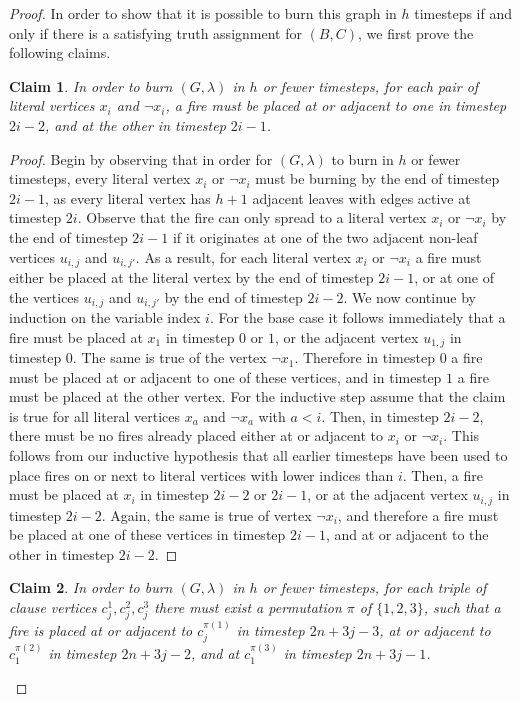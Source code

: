 \documentclass[preprint,12pt]{elsarticle}
\newtheorem{claim}{Claim}
\begin{document}
\begin{proof}
    In order to show that it is possible to burn this graph in $h$ timesteps if and only if there is a satisfying truth assignment for $(B, C)$, we first prove the following claims.


    \begin{claim}
        \label{clm:literalsinturn1}
        In order to burn $(G, \lambda)$ in $h$ or fewer timesteps, for each pair of literal vertices $x_i$ and $\lnot x_i$, a fire must be placed at or adjacent to one in timestep $2i-2$, and at the other in timestep $2i-1$.
    \end{claim}
    \begin{proof}
        Begin by observing that in order for $(G, \lambda)$ to burn in $h$ or fewer timesteps, every literal vertex $x_i$ or $\lnot x_i$ must be burning by the end of timestep $2i-1$, as every literal vertex has $h+1$ adjacent leaves with edges active at timestep $2i$. Observe that the fire can only spread to a literal vertex $x_i$ or $\lnot x_i$ by the end of timestep $2i-1$ if it originates at one of the two adjacent non-leaf vertices $u_{i,j}$ and $u_{i,j'}$. As a result, for each literal vertex $x_i$ or $\lnot x_i$ a fire must either be placed at the literal vertex by the end of timestep $2i-1$, or at one of the vertices $u_{i,j}$ and $u_{i,j'}$ by the end of timestep $2i-2$. We now continue by induction on the variable index $i$. For the base case it follows immediately that a fire must be placed at $x_1$ in timestep $0$ or $1$, or the adjacent vertex $u_{1,j}$ in timestep $0$. The same is true of the vertex $\lnot x_1$. Therefore in timestep $0$ a fire must be placed at or adjacent to one of these vertices, and in timestep $1$ a fire must be placed at the other vertex. For the inductive step assume that the claim is true for all literal vertices $x_a$ and $\lnot x_a$ with $a < i$. Then, in timestep $2i-2$, there must be no fires already placed either at or adjacent to $x_i$ or $\lnot x_i$. This follows from our inductive hypothesis that all earlier timesteps have been used to place fires on or next to literal vertices with lower indices than $i$. Then, a fire must be placed at $x_i$ in timestep $2i-2$ or $2i-1$, or at the adjacent vertex $u_{i,j}$ in timestep $2i-2$. Again, the same is true of vertex $\lnot x_i$, and therefore a fire must be placed at one of these vertices in timestep $2i-1$, and at or adjacent to the other in timestep $2i-2$.
    \end{proof}
    \begin{claim}
        \label{clm:clausesinturn1}
    	In order to burn $(G, \lambda)$ in $h$ or fewer timesteps, for each triple of clause vertices $c_j^1, c_j^2, c_j^3$ there must exist a permutation $\pi$ of $\{1, 2, 3\}$, such that a fire is placed at or adjacent to $c_j^{\pi(1)}$ in timestep $2n+3j-3$, at or adjacent to $c_1^{\pi(2)}$ in timestep $2n+3j-2$, and at $c_1^{\pi(3)}$ in timestep $2n+3j-1$.

\end{claim}
\end{proof}
\end{document}
